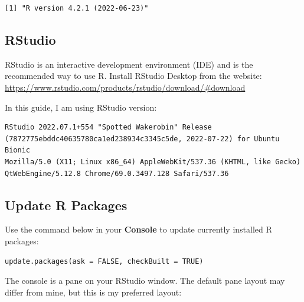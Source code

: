 \documentclass[
  letterpaper,
  DIV=11,
  numbers=noendperiod]{scrreprt}
\begin{document}
\begin{verbatim}
[1] "R version 4.2.1 (2022-06-23)"
\end{verbatim}

\hypertarget{rstudio}{%
\subsection{RStudio}\label{rstudio}}

RStudio is an interactive development environment (IDE) and is the
recommended way to use R. Install RStudio Desktop from the website:
\url{https://www.rstudio.com/products/rstudio/download/\#download}

In this guide, I am using RStudio version:

\begin{verbatim}
RStudio 2022.07.1+554 "Spotted Wakerobin" Release (7872775ebddc40635780ca1ed238934c3345c5de, 2022-07-22) for Ubuntu Bionic  
Mozilla/5.0 (X11; Linux x86_64) AppleWebKit/537.36 (KHTML, like Gecko) QtWebEngine/5.12.8 Chrome/69.0.3497.128 Safari/537.36  
\end{verbatim}

\hypertarget{update-r-packages}{%
\subsection{Update R Packages}\label{update-r-packages}}

Use the command below in your \textbf{Console} to update currently
installed R packages:

\begin{verbatim}
update.packages(ask = FALSE, checkBuilt = TRUE)
\end{verbatim}

The console is a pane on your RStudio window. The default pane layout
may differ from mine, but this is my preferred layout:
\end{document}
